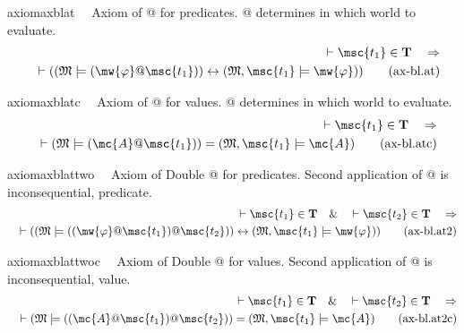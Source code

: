 \begin{restatable}{axiom}{axblat}~~ Axiom of @ for predicates.
   @ determines in which world to evaluate.
\begin{align}
\vdash \msc{t_1} \in \mathbf{T}\quad\Rightarrow \notag \\ 
	\quad \vdash ( ( \mathfrak{M}
    \models ( \mw{\varphi} @ \msc{t_1} ) ) \leftrightarrow ( \mathfrak{M} ,
    \msc{t_1} \models \mw{\varphi} ) )\label{eq:ax-bl.at}\tag{ax-bl.at}
\end{align}
\end{restatable}

\begin{restatable}{axiom}{axblatc}~~ Axiom of @ for values.
   @ determines in which world to evaluate.
\begin{align}
\vdash \msc{t_1} \in \mathbf{T}\quad\Rightarrow \notag \\ 
	\quad \vdash ( \mathfrak{M}
    \models ( \mc{A} @ \msc{t_1} ) ) = ( \mathfrak{M} , \msc{t_1} \models
    \mc{A} )\label{eq:ax-bl.atc}\tag{ax-bl.atc}
\end{align}
\end{restatable}

\begin{restatable}{axiom}{axblattwo}~~ Axiom of Double @ for predicates.
   Second application of @ is inconsequential, predicate.
\begin{align}
\vdash \msc{t_1} \in \mathbf{T}\quad\&\quad \vdash \msc{t_2} \in
    \mathbf{T}\quad\Rightarrow \notag \\ 
	\quad \vdash ( ( \mathfrak{M} \models ( (
    \mw{\varphi} @ \msc{t_1} ) @ \msc{t_2} ) ) \leftrightarrow ( \mathfrak{M} ,
    \msc{t_1} \models \mw{\varphi} ) )\label{eq:ax-bl.at2}\tag{ax-bl.at2}
\end{align}
\end{restatable}

\begin{restatable}{axiom}{axblattwoc}~~ Axiom of Double @ for values.
   Second application of @ is inconsequential, value.
\begin{align}
\vdash \msc{t_1} \in \mathbf{T}\quad\&\quad \vdash \msc{t_2} \in
    \mathbf{T}\quad\Rightarrow \notag \\ 
	\quad \vdash ( \mathfrak{M} \models ( ( \mc{A} @
    \msc{t_1} ) @ \msc{t_2} ) ) = ( \mathfrak{M} , \msc{t_1} \models \mc{A}
    )\label{eq:ax-bl.at2c}\tag{ax-bl.at2c}
\end{align}
\end{restatable}


